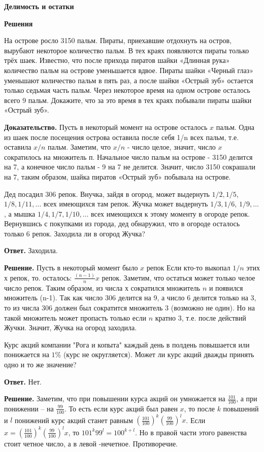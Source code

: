 \centerline{\bf \Huge Делимость и остатки}
\centerline{\bf \Huge Решения}

На острове росло 3150 пальм. Пираты, приехавшие отдохнуть на остров, вырубают некоторое количество пальм. В тех краях появляются пираты только трёх шаек. Известно, что после прихода пиратов шайки «Длинная рука» количество пальм на острове уменьшается вдвое. Пираты шайки «Черный глаз» уменьшают количество пальм в пять раз, а после шайки «Острый зуб» остается только седьмая часть пальм. Через некоторое время на одном острове осталось всего 9 пальм. Докажите, что за это время в тех краях побывали пираты шайки «Острый зуб».

\textbf{Доказательство.} Пусть в некоторый момент на острове осталось $x$ пальм. Одна из шаек после посещения острова оставила после себя 1/n всех пальм, т.е. оставила $x / n$ пальм. Заметим, что $x / n$ - число целое, значит, число $x$ сократилось на множитель п. Начальное число пальм на острове - 3150 делится на 7, а конечное число пальм - 9 на 7 не делится. Значит, число 3150 сокрашали на 7, таким образом, шайка пиратов «Острый зуб» побывала на острове.

Дед посадил 306 репок. Внучка, зайдя в огород, может выдернуть $1 / 2,1 / 5$, $1 / 8,1 / 11, \ldots$ всех имеющихся там репок. Жучка может выдернуть $1 / 3,1 / 6$, $1 / 9, \ldots$, а мышка $1 / 4,1 / 7,1 / 10, \ldots$ всех имеющихся к этому моменту в огороде репок. Вернувшись с покупками из города, дед обнаружил, что в огороде осталось только 6 репок. Заходила ли в огород Жучка?

\textbf{Ответ.} Заходила.

\textbf{Решение.} Пусть в некоторый момент было $x$ репок Если кто-то выкопал $1 / n$ этих х репок, то. осталось: $\frac{(n-1)}{n} x$ репок. Заметим, что остаться может только челое число репок. Таким образом, из числа х сократился множитель $n$ и появился множитель (n-1). Так как число 306 делится на 9, а число 6 делится только на 3, то из числа 306 должен был сократится множитель 3 (возможно не один). Но на такой множитель может пропасть только если $n$ кратно 3, т.е. после действий Жучки. Значит, Жучка на огород заходила.

Курс акций компании "Рога и копыта" каждый день в полдень повышается или понижается на $1 \%$ (курс не округляется). Может ли курс акций дважды принять одно и то же значение?

\textbf{Ответ.} Нет.

\textbf{Решение.} Заметим, что при повышении курса акций он умножается на $\frac{101}{100}$, а при понижении -- на $\frac{99}{100}$. То есть если курс акций был равен $x$, то после $k$ повышений и $l$ понижений курс акций станет равным $\left(\frac{101}{100}\right)^k\left(\frac{99}{100}\right)^l x$. Если $x=\left(\frac{101}{100}\right)^k\left(\frac{99}{100}\right)^l x$, то $101^k 99^l=100^{k+l}$. Но в правой части этого равенства стоит четное число, а в левой -нечетное. Противоречие.

